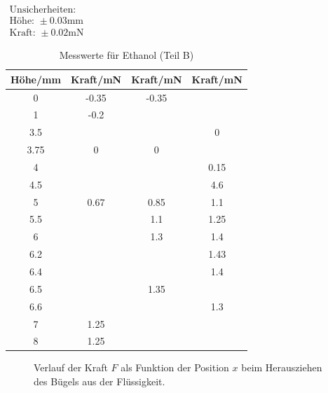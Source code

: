 \documentclass[11pt,a4paper]{article}
\begin{document}
\begin{table}[h]
\caption{Messwerte für Ethanol (Teil B)} \vspace{11pt}
\centering
$\begin{array}{l}
\textrm{Unsicherheiten:}\\
\textrm{Höhe: } \pm 0.03 \textrm{mm}\\
\textrm{Kraft: } \pm 0.02 \textrm{mN}
\end{array}$
\begin{tabular}{cccc}
\toprule
\textrm{H\"ohe}/\textrm{mm}& \textrm{Kraft}/\textrm{mN} & \textrm{Kraft}/\textrm{mN} & \textrm{Kraft}/\textrm{mN} \\
\midrule 
0 & -0.35 & -0.35 & \\
\hline
1 & -0.2 & & \\
\hline 
3.5 & & & 0\\
\hline 
3.75 & 0 & 0 & \\
\hline 
4 & & & 0.15\\ 
\hline
4.5 & & & 4.6\\ 
\hline
5 & 0.67 & 0.85 & 1.1\\ 
\hline
5.5 & & 1.1 & 1.25\\ 
\hline
6 & & 1.3 & 1.4\\ 
\hline 
6.2 & & & 1.43\\ 
\hline
6.4 & & & 1.4\\ 
\hline
6.5 & & 1.35 & \\ 
\hline
6.6 & & & 1.3\\ 
\hline
7 & 1.25 & & \\ 
\hline
8 & 1.25 & &\\
\bottomrule 
\end{tabular}
\label{tabme}
\end{table}

\begin{figure}[p]
\centering
{}
\renewcommand\thefigure{B3}
\caption[Kraft/Höhe Diagramm Wasser]{Verlauf der Kraft $F$ als Funktion der Position $x$ beim Herausziehen des B\"ugels aus der Fl\"ussigkeit.}
\label{ab3}
\end{figure}
\end{document}

